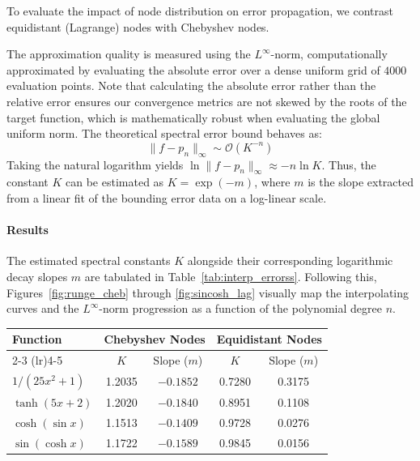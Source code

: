 \begin{solution}

	To evaluate the impact of node distribution on error propagation, we contrast
	equidistant (Lagrange) nodes with Chebyshev nodes.

	The approximation quality is measured using the $L^\infty$-norm,
	computationally approximated by evaluating the absolute error over a dense
	uniform grid of $4000$ evaluation points. Note that calculating the absolute
	error rather than the relative error ensures our convergence metrics are not
	skewed by the roots of the target function, which is mathematically robust when
	evaluating the global uniform norm. The theoretical spectral error bound behaves
	as:
	\[
		\|f - p_n\|_\infty \sim \mathcal{O}(K^{-n})
	\]
	Taking the natural logarithm yields $\ln \|f - p_n\|_\infty \approx -n \ln K$.
	Thus, the constant $K$ can be estimated as $K = \exp(-m)$, where $m$ is the
	slope extracted from a linear fit of the bounding error data on a log-linear
	scale.

	\paragraph{Results}
	The estimated spectral constants $K$ alongside their corresponding logarithmic
	decay slopes $m$ are tabulated in Table~\ref{tab:interp_errorss}. Following
	this, Figures~\ref{fig:runge_cheb} through \ref{fig:sincosh_lag} visually map
	the interpolating curves and the $L^\infty$-norm progression as a function of
	the polynomial degree $n$.

	\begin{center}
		\centering
		\label{tab:interp_errorss}
		\renewcommand{\arraystretch}{1.2}
		\begin{tabular}{lcccc}
			\toprule
			Function        & \multicolumn{2}{c}{Chebyshev Nodes} & \multicolumn{2}{c}{Equidistant Nodes}                        \\
			\cmidrule(lr){2-3} \cmidrule(lr){4-5}
			                & $K$                                 & Slope ($m$)                           & $K$    & Slope ($m$) \\
			\midrule
			$1/(25x^2 + 1)$ & 1.2035                              & $-0.1852$                             & 0.7280 & 0.3175      \\
			$\tanh(5x + 2)$ & 1.2020                              & $-0.1840$                             & 0.8951 & 0.1108      \\
			$\cosh(\sin x)$ & 1.1513                              & $-0.1409$                             & 0.9728 & 0.0276      \\
			$\sin(\cosh x)$ & 1.1722                              & $-0.1589$                             & 0.9845 & 0.0156      \\
			\bottomrule
		\end{tabular}
	\end{center}


\end{solution}
